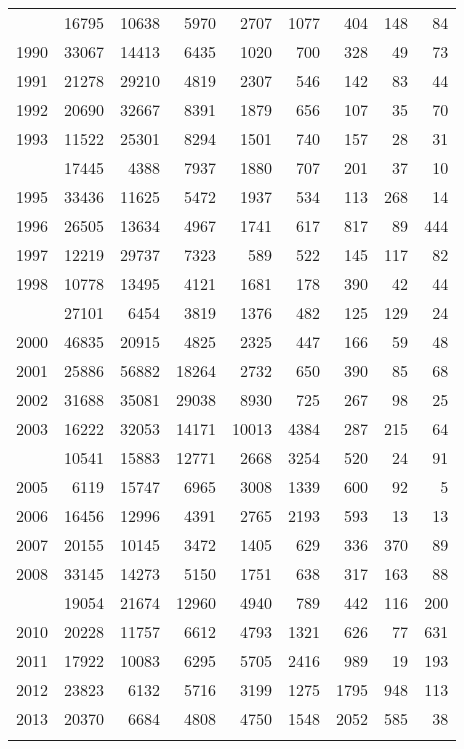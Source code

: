 \documentclass[
]{article}
\begin{document}
\begin{longtable}[t]{lrrrrrrrr}
\endfoot
\bottomrule
\endlastfoot
1989 & 16795 & 10638 & 5970 & 2707 & 1077 & 404 & 148 & 84\\
1990 & 33067 & 14413 & 6435 & 1020 & 700 & 328 & 49 & 73\\
1991 & 21278 & 29210 & 4819 & 2307 & 546 & 142 & 83 & 44\\
1992 & 20690 & 32667 & 8391 & 1879 & 656 & 107 & 35 & 70\\
1993 & 11522 & 25301 & 8294 & 1501 & 740 & 157 & 28 & 31\\
\addlinespace
1994 & 17445 & 4388 & 7937 & 1880 & 707 & 201 & 37 & 10\\
1995 & 33436 & 11625 & 5472 & 1937 & 534 & 113 & 268 & 14\\
1996 & 26505 & 13634 & 4967 & 1741 & 617 & 817 & 89 & 444\\
1997 & 12219 & 29737 & 7323 & 589 & 522 & 145 & 117 & 82\\
1998 & 10778 & 13495 & 4121 & 1681 & 178 & 390 & 42 & 44\\
\addlinespace
1999 & 27101 & 6454 & 3819 & 1376 & 482 & 125 & 129 & 24\\
2000 & 46835 & 20915 & 4825 & 2325 & 447 & 166 & 59 & 48\\
2001 & 25886 & 56882 & 18264 & 2732 & 650 & 390 & 85 & 68\\
2002 & 31688 & 35081 & 29038 & 8930 & 725 & 267 & 98 & 25\\
2003 & 16222 & 32053 & 14171 & 10013 & 4384 & 287 & 215 & 64\\
\addlinespace
2004 & 10541 & 15883 & 12771 & 2668 & 3254 & 520 & 24 & 91\\
2005 & 6119 & 15747 & 6965 & 3008 & 1339 & 600 & 92 & 5\\
2006 & 16456 & 12996 & 4391 & 2765 & 2193 & 593 & 13 & 13\\
2007 & 20155 & 10145 & 3472 & 1405 & 629 & 336 & 370 & 89\\
2008 & 33145 & 14273 & 5150 & 1751 & 638 & 317 & 163 & 88\\
\addlinespace
2009 & 19054 & 21674 & 12960 & 4940 & 789 & 442 & 116 & 200\\
2010 & 20228 & 11757 & 6612 & 4793 & 1321 & 626 & 77 & 631\\
2011 & 17922 & 10083 & 6295 & 5705 & 2416 & 989 & 19 & 193\\
2012 & 23823 & 6132 & 5716 & 3199 & 1275 & 1795 & 948 & 113\\
2013 & 20370 & 6684 & 4808 & 4750 & 1548 & 2052 & 585 & 38\\
\addlinespace

\end{longtable}
\end{document}

